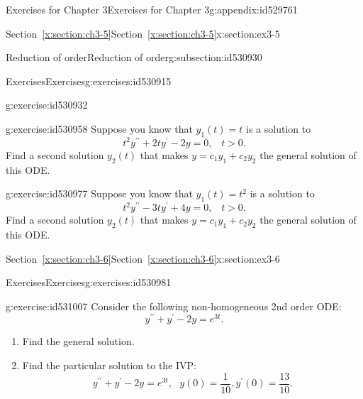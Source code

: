 \documentclass[oneside,10pt,]{book}
\newcommand{\xreffont}{\relax}
\numberwithin{equation}{section}
\numberwithin{equation}{section}
\begin{document}
\begin{appendixptx}{Exercises for Chapter 3}{}{Exercises for Chapter 3}{}{}{g:appendix:id529761}
\begin{sectionptx}{Section~{\xreffont\ref*{x:section:ch3-5}}}{}{Section~{\xreffont\ref*{x:section:ch3-5}}}{}{}{x:section:ex3-5}
\begin{subsectionptx}{Reduction of order}{}{Reduction of order}{}{}{g:subsection:id530930}
\begin{exercises-subsubsection-numberless}{Exercises}{}{Exercises}{}{}{g:exercises:id530915}
\begin{divisionexercise}{2}{}{}{g:exercise:id530932}
\end{divisionexercise}%
\begin{divisionexercise}{3}{}{}{g:exercise:id530958}%
Suppose you know that \(y_{1}(t)=t\) is a solution to%
\begin{equation*}
t^{2}y^{\prime\prime}+2ty^{\prime}-2y=0,\,\,\,\,\,t>0.
\end{equation*}
Find a second solution \(y_{2}(t)\) that makes \(y=c_{1}y_{1}+c_{2}y_{2}\) the general solution of this ODE.%
\end{divisionexercise}%
\begin{divisionexercise}{4}{}{}{g:exercise:id530977}%
Suppose you know that \(y_{1}(t)=t^{2}\) is a solution to%
\begin{equation*}
t^{2}y^{\prime\prime}-3ty^{\prime}+4y=0,\,\,\,\,\,t>0.
\end{equation*}
Find a second solution \(y_{2}(t)\) that makes \(y=c_{1}y_{1}+c_{2}y_{2}\) the general solution of this ODE.%
\end{divisionexercise}%
\end{exercises-subsubsection-numberless}
\end{subsectionptx}
\end{sectionptx}
%
%
\typeout{************************************************}
\typeout{Section D.5 Section~{\xreffont\ref*{x:section:ch3-6}}}
\typeout{************************************************}
%
\begin{sectionptx}{Section~{\xreffont\ref*{x:section:ch3-6}}}{}{Section~{\xreffont\ref*{x:section:ch3-6}}}{}{}{x:section:ex3-6}
%
%
\typeout{************************************************}
\typeout{************************************************}
%
\begin{exercises-subsection-numberless}{Exercises}{}{Exercises}{}{}{g:exercises:id530981}
\begin{divisionexercise}{1}{}{}{g:exercise:id531007}%
Consider the following non-homogeneous 2nd order ODE:%
%
\begin{equation*}
y^{\prime\prime}+y^{\prime}-2y=e^{3t}.
\end{equation*}
%
\begin{enumerate}[label=(\alph*)]
\item{}Find the general solution.%
\item{}Find the particular solution to the IVP:%
\begin{equation*}
y^{\prime\prime}+y^{\prime}-2y=e^{3t},\,\,\,\,y(0)=\frac{1}{10},y^{\prime}(0)=\frac{13}{10}.
\end{equation*}

\end{enumerate}
\end{divisionexercise}
\end{exercises-subsection-numberless}
\end{sectionptx}
\end{appendixptx}
\end{document}

